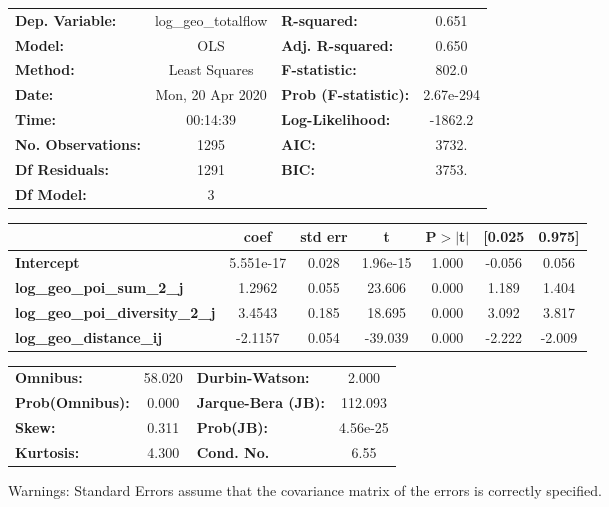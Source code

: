 \begin{center}
\begin{tabular}{lclc}
\toprule
\textbf{Dep. Variable:}                 & log\_geo\_totalflow & \textbf{  R-squared:         } &     0.651   \\
\textbf{Model:}                         &         OLS         & \textbf{  Adj. R-squared:    } &     0.650   \\
\textbf{Method:}                        &    Least Squares    & \textbf{  F-statistic:       } &     802.0   \\
\textbf{Date:}                          &   Mon, 20 Apr 2020  & \textbf{  Prob (F-statistic):} & 2.67e-294   \\
\textbf{Time:}                          &       00:14:39      & \textbf{  Log-Likelihood:    } &   -1862.2   \\
\textbf{No. Observations:}              &          1295       & \textbf{  AIC:               } &     3732.   \\
\textbf{Df Residuals:}                  &          1291       & \textbf{  BIC:               } &     3753.   \\
\textbf{Df Model:}                      &             3       & \textbf{                     } &             \\
\bottomrule
\end{tabular}
\begin{tabular}{lcccccc}
                                        & \textbf{coef} & \textbf{std err} & \textbf{t} & \textbf{P$> |$t$|$} & \textbf{[0.025} & \textbf{0.975]}  \\
\midrule
\textbf{Intercept}                      &    5.551e-17  &        0.028     &  1.96e-15  &         1.000        &       -0.056    &        0.056     \\
\textbf{log\_geo\_poi\_sum\_2\_j}       &       1.2962  &        0.055     &    23.606  &         0.000        &        1.189    &        1.404     \\
\textbf{log\_geo\_poi\_diversity\_2\_j} &       3.4543  &        0.185     &    18.695  &         0.000        &        3.092    &        3.817     \\
\textbf{log\_geo\_distance\_ij}         &      -2.1157  &        0.054     &   -39.039  &         0.000        &       -2.222    &       -2.009     \\
\bottomrule
\end{tabular}
\begin{tabular}{lclc}
\textbf{Omnibus:}       & 58.020 & \textbf{  Durbin-Watson:     } &    2.000  \\
\textbf{Prob(Omnibus):} &  0.000 & \textbf{  Jarque-Bera (JB):  } &  112.093  \\
\textbf{Skew:}          &  0.311 & \textbf{  Prob(JB):          } & 4.56e-25  \\
\textbf{Kurtosis:}      &  4.300 & \textbf{  Cond. No.          } &     6.55  \\
\bottomrule
\end{tabular}
\end{center}

Warnings: \newline
 [1] Standard Errors assume that the covariance matrix of the errors is correctly specified.